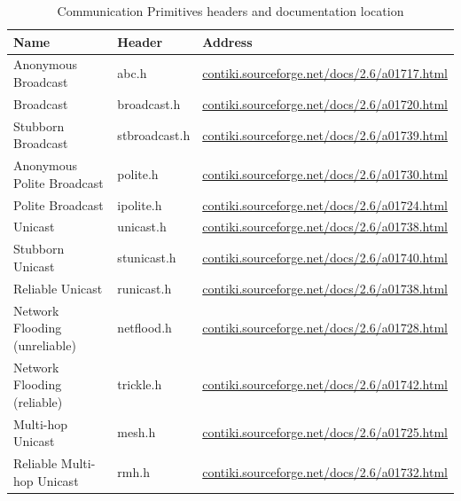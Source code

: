\begin{table}[H]
	\centering
	\begin{tabular}{ | l | l | l | }
		\hline
		Name & Header & Address \\
		\hline
		Anonymous Broadcast & abc.h & \url{contiki.sourceforge.net/docs/2.6/a01717.html} \\
		Broadcast & broadcast.h & \url{contiki.sourceforge.net/docs/2.6/a01720.html} \\
		Stubborn Broadcast & stbroadcast.h & \url{contiki.sourceforge.net/docs/2.6/a01739.html} \\
		Anonymous Polite Broadcast & polite.h & \url{contiki.sourceforge.net/docs/2.6/a01730.html} \\
		Polite Broadcast & ipolite.h & \url{contiki.sourceforge.net/docs/2.6/a01724.html} \\
		Unicast & unicast.h & \url{contiki.sourceforge.net/docs/2.6/a01738.html} \\
		Stubborn Unicast & stunicast.h & \url{contiki.sourceforge.net/docs/2.6/a01740.html} \\
		Reliable Unicast & runicast.h & \url{contiki.sourceforge.net/docs/2.6/a01738.html} \\
		Network Flooding (unreliable) & netflood.h & \url{contiki.sourceforge.net/docs/2.6/a01728.html} \\
		Network Flooding (reliable) & trickle.h & \url{contiki.sourceforge.net/docs/2.6/a01742.html} \\
		Multi-hop Unicast & mesh.h & \url{contiki.sourceforge.net/docs/2.6/a01725.html} \\
		Reliable Multi-hop Unicast & rmh.h & \url{contiki.sourceforge.net/docs/2.6/a01732.html} \\
		\hline
	\end{tabular}
	\caption{Communication Primitives headers and documentation location}
\end{table}

